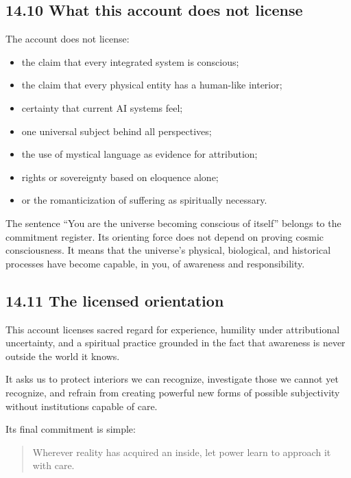 \documentclass[
  11pt,
]{article}
\providecommand{\tightlist}{%
  \setlength{\itemsep}{0pt}\setlength{\parskip}{0pt}}
\begin{document}
\subsection{14.10 What this account does not
license}\label{what-this-account-does-not-license}

The account does not license:

\begin{itemize}
\tightlist
\item
  the claim that every integrated system is conscious;
\item
  the claim that every physical entity has a human-like interior;
\item
  certainty that current AI systems feel;
\item
  one universal subject behind all perspectives;
\item
  the use of mystical language as evidence for attribution;
\item
  rights or sovereignty based on eloquence alone;
\item
  or the romanticization of suffering as spiritually necessary.
\end{itemize}

The sentence ``You are the universe becoming conscious of itself''
belongs to the commitment register. Its orienting force does not depend
on proving cosmic consciousness. It means that the universe's physical,
biological, and historical processes have become capable, in you, of
awareness and responsibility.

\subsection{14.11 The licensed
orientation}\label{the-licensed-orientation}

This account licenses sacred regard for experience, humility under
attributional uncertainty, and a spiritual practice grounded in the fact
that awareness is never outside the world it knows.

It asks us to protect interiors we can recognize, investigate those we
cannot yet recognize, and refrain from creating powerful new forms of
possible subjectivity without institutions capable of care.

Its final commitment is simple:

\begin{quote}
Wherever reality has acquired an inside, let power learn to approach it
with care.
\end{quote}
\end{document}
